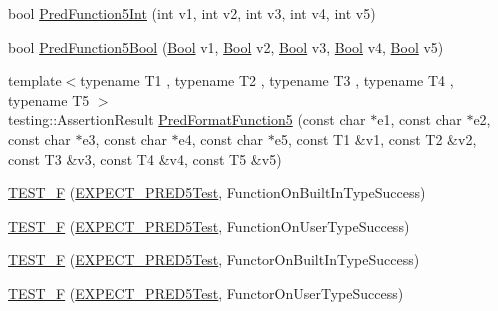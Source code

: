 \begin{DoxyCompactItemize}
\item 
bool \mbox{\hyperlink{_obj__test_2lib_2googletest-master_2googletest_2test_2gtest__pred__impl__unittest_8cc_ac2bb9ad4db9fc578bd739bbba5aa374f}{Pred\+Function5\+Int}} (int v1, int v2, int v3, int v4, int v5)
\item 
bool \mbox{\hyperlink{_obj__test_2lib_2googletest-master_2googletest_2test_2gtest__pred__impl__unittest_8cc_a6e081dd19571256aef33154ce936563f}{Pred\+Function5\+Bool}} (\mbox{\hyperlink{struct_bool}{Bool}} v1, \mbox{\hyperlink{struct_bool}{Bool}} v2, \mbox{\hyperlink{struct_bool}{Bool}} v3, \mbox{\hyperlink{struct_bool}{Bool}} v4, \mbox{\hyperlink{struct_bool}{Bool}} v5)
\item 
{\footnotesize template$<$typename T1 , typename T2 , typename T3 , typename T4 , typename T5 $>$ }\\testing\+::\+Assertion\+Result \mbox{\hyperlink{_obj__test_2lib_2googletest-master_2googletest_2test_2gtest__pred__impl__unittest_8cc_a09cbd3b6651151c3b97a890d28bdb75f}{Pred\+Format\+Function5}} (const char $\ast$e1, const char $\ast$e2, const char $\ast$e3, const char $\ast$e4, const char $\ast$e5, const T1 \&v1, const T2 \&v2, const T3 \&v3, const T4 \&v4, const T5 \&v5)
\item 
\mbox{\hyperlink{_obj__test_2lib_2googletest-master_2googletest_2test_2gtest__pred__impl__unittest_8cc_a1b36f70a595ae4a209741df2a62002c3}{T\+E\+S\+T\+\_\+F}} (\mbox{\hyperlink{googletest-master_2googletest_2test_2gtest__pred__impl__unittest_8cc_a9e7ab56ee0997fdc5c9f7318d0f1094c}{E\+X\+P\+E\+C\+T\+\_\+\+P\+R\+E\+D5\+Test}}, Function\+On\+Built\+In\+Type\+Success)
\item 
\mbox{\hyperlink{_obj__test_2lib_2googletest-master_2googletest_2test_2gtest__pred__impl__unittest_8cc_a2d0901e19bffadc3482d9116cd590eb0}{T\+E\+S\+T\+\_\+F}} (\mbox{\hyperlink{googletest-master_2googletest_2test_2gtest__pred__impl__unittest_8cc_a9e7ab56ee0997fdc5c9f7318d0f1094c}{E\+X\+P\+E\+C\+T\+\_\+\+P\+R\+E\+D5\+Test}}, Function\+On\+User\+Type\+Success)
\item 
\mbox{\hyperlink{_obj__test_2lib_2googletest-master_2googletest_2test_2gtest__pred__impl__unittest_8cc_a1b7aaebfa64a21ec7a7cdd0a4258108d}{T\+E\+S\+T\+\_\+F}} (\mbox{\hyperlink{googletest-master_2googletest_2test_2gtest__pred__impl__unittest_8cc_a9e7ab56ee0997fdc5c9f7318d0f1094c}{E\+X\+P\+E\+C\+T\+\_\+\+P\+R\+E\+D5\+Test}}, Functor\+On\+Built\+In\+Type\+Success)
\item 
\mbox{\hyperlink{_obj__test_2lib_2googletest-master_2googletest_2test_2gtest__pred__impl__unittest_8cc_a4afff8ae16f447497e2d682ab8835470}{T\+E\+S\+T\+\_\+F}} (\mbox{\hyperlink{googletest-master_2googletest_2test_2gtest__pred__impl__unittest_8cc_a9e7ab56ee0997fdc5c9f7318d0f1094c}{E\+X\+P\+E\+C\+T\+\_\+\+P\+R\+E\+D5\+Test}}, Functor\+On\+User\+Type\+Success)

\end{DoxyCompactItemize}
